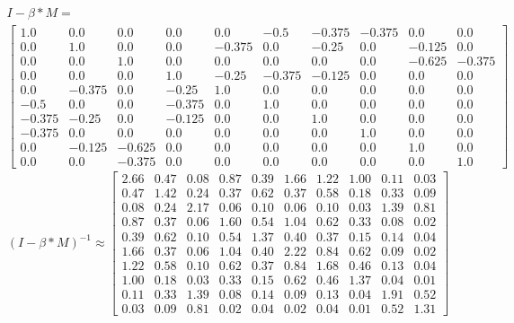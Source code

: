 \begin{gather}
	\nonumber I - \beta * M = \\
	\begin{bmatrix}
		1.0 & 0.0 & 0.0 & 0.0 & 0.0 & -0.5 & -0.375 & -0.375 & 0.0 & 0.0\\
		0.0 & 1.0 & 0.0 & 0.0 & -0.375 & 0.0 & -0.25 & 0.0 & -0.125 & 0.0\\
		0.0 & 0.0 & 1.0 & 0.0 & 0.0 & 0.0 & 0.0 & 0.0 & -0.625 & -0.375\\
		0.0 & 0.0 & 0.0 & 1.0 & -0.25 & -0.375 & -0.125 & 0.0 & 0.0 & 0.0\\
		0.0 & -0.375 & 0.0 & -0.25 & 1.0 & 0.0 & 0.0 & 0.0 & 0.0 & 0.0\\
		-0.5 & 0.0 & 0.0 & -0.375 & 0.0 & 1.0 & 0.0 & 0.0 & 0.0 & 0.0\\
		-0.375 & -0.25 & 0.0 & -0.125 & 0.0 & 0.0 & 1.0 & 0.0 & 0.0 & 0.0\\
		-0.375 & 0.0 & 0.0 & 0.0 & 0.0 & 0.0 & 0.0 & 1.0 & 0.0 & 0.0\\
		0.0 & -0.125 & -0.625 & 0.0 & 0.0 & 0.0 & 0.0 & 0.0 & 1.0 & 0.0\\
		0.0 & 0.0 & -0.375 & 0.0 & 0.0 & 0.0 & 0.0 & 0.0 & 0.0 & 1.0
	\end{bmatrix}
	\label{frml:berechnungDerKatzZentralitaet:formel3}
\end{gather}
\begin{equation}
	(I - \beta * M)^{-1} \approx \begin{bmatrix}
		2.66 & 0.47 & 0.08 & 0.87 & 0.39 & 1.66 & 1.22 & 1.00 & 0.11 & 0.03\\
		0.47 & 1.42 & 0.24 & 0.37 & 0.62 & 0.37 & 0.58 & 0.18 & 0.33 & 0.09\\
		0.08 & 0.24 & 2.17 & 0.06 & 0.10 & 0.06 & 0.10 & 0.03 & 1.39 & 0.81\\
		0.87 & 0.37 & 0.06 & 1.60 & 0.54 & 1.04 & 0.62 & 0.33 & 0.08 & 0.02\\
		0.39 & 0.62 & 0.10 & 0.54 & 1.37 & 0.40 & 0.37 & 0.15 & 0.14 & 0.04\\
		1.66 & 0.37 & 0.06 & 1.04 & 0.40 & 2.22 & 0.84 & 0.62 & 0.09 & 0.02\\
		1.22 & 0.58 & 0.10 & 0.62 & 0.37 & 0.84 & 1.68 & 0.46 & 0.13 & 0.04\\
		1.00 & 0.18 & 0.03 & 0.33 & 0.15 & 0.62 & 0.46 & 1.37 & 0.04 & 0.01\\
		0.11 & 0.33 & 1.39 & 0.08 & 0.14 & 0.09 & 0.13 & 0.04 & 1.91 & 0.52\\
		0.03 & 0.09 & 0.81 & 0.02 & 0.04 & 0.02 & 0.04 & 0.01 & 0.52 & 1.31
	\end{bmatrix}
	\label{frml:berechnungDerKatzZentralitaet:formel4}
\end{equation}
